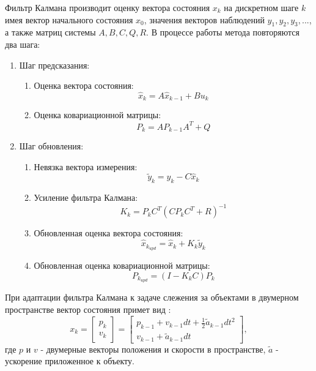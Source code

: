 Фильтр Калмана производит оценку вектора состояния $x_k$ на дискретном шаге $k$ имея вектор начального состояния $x_0$, значения векторов наблюдений $y_1, y_2, y_3, ...$, а также матриц системы $A, B, C, Q, R$.
В процессе работы метода повторяются два шага: 
\begin{enumerate}
    \item Шаг предсказания:
    \begin{enumerate}
        \item Оценка вектора состояния:
        \begin{equation}
            \widehat{x}_k = A \widehat{x}_{k-1} + B u_k
        \end{equation}
        \item Оценка ковариационной матрицы: 
        \begin{equation}
            P_k = A P_{k-1} A^T + Q
        \end{equation}
    \end{enumerate}
    \item Шаг обновления:
    \begin{enumerate}
        \item Невязка вектора измерения:
        \begin{equation}
            \widetilde{y}_k = y_k - C \widehat{x}_k
        \end{equation}
        \item Усиление фильтра Калмана: 
        \begin{equation}
            K_k = P_k C^T (C P_k C^T + R)^{-1}
        \end{equation}
        \item Обновленная оценка вектора состояния: 
        \begin{equation}
            \widehat{x}_{k_{upd}} = \widehat{x}_k + K_k \widetilde{y}_k
        \end{equation}
        \item Обновленная оценка ковариационной матрицы: 
        \begin{equation}
            P_{k_{upd}} = (I - K_k C)P_k
        \end{equation}
    \end{enumerate}
\end{enumerate}


При адаптации фильтра Калмана к задаче слежения за объектами в двумерном пространстве вектор состояния примет вид \cite{saho2017kalman}:
\begin{equation}
    x_k = \begin{bmatrix}
        p_k \\
        v_k
    \end{bmatrix} = \begin{bmatrix}
        p_{k−1} + v_{k−1}dt + \frac{1}{2} \widetilde{a}_{k-1} dt^2 \\
        v_{k-1} + \widetilde{a}_{k-1}dt
    \end{bmatrix},
\end{equation}
где $p$ и $v$ - двумерные векторы положения и скорости в пространстве, $\widetilde{a}$ - ускорение приложенное к объекту.

